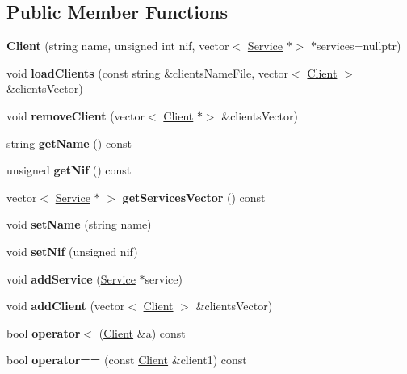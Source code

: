 \subsection*{Public Member Functions}
\begin{DoxyCompactItemize}
\item 
\mbox{\label{class_client_a3cdfb856b1cccd81052f589c850ab86f}} 
{\bfseries Client} (string name, unsigned int nif, vector$<$ \hyperlink{class_service}{Service} $\ast$$>$ $\ast$services=nullptr)
\item 
\mbox{\label{class_client_aeca0569267dbf7d1b20e4d77b98326af}} 
void {\bfseries load\+Clients} (const string \&clients\+Name\+File, vector$<$ \hyperlink{class_client}{Client} $>$ \&clients\+Vector)
\item 
\mbox{\label{class_client_a7f845c33f4aa7b7081ae72d9a16c2d3f}} 
void {\bfseries remove\+Client} (vector$<$ \hyperlink{class_client}{Client} $\ast$$>$ \&clients\+Vector)
\item 
\mbox{\label{class_client_a5c473ba52d7678744edec9e51052c947}} 
string {\bfseries get\+Name} () const
\item 
\mbox{\label{class_client_a35c9fed8cdb36d28fd5e51bd2aee852e}} 
unsigned {\bfseries get\+Nif} () const
\item 
\mbox{\label{class_client_ae241a8ae0811ea7c023dbc69d345a8b4}} 
vector$<$ \hyperlink{class_service}{Service} $\ast$ $>$ {\bfseries get\+Services\+Vector} () const
\item 
\mbox{\label{class_client_a1c7f938360e23b3e0e52d17965f88725}} 
void {\bfseries set\+Name} (string name)
\item 
\mbox{\label{class_client_a8d0ab1a3c654d361dacde7e1d2b92c94}} 
void {\bfseries set\+Nif} (unsigned nif)
\item 
\mbox{\label{class_client_abf36aa7168464608e917fa40f1ba52db}} 
void {\bfseries add\+Service} (\hyperlink{class_service}{Service} $\ast$service)
\item 
\mbox{\label{class_client_a2f9628fce03c1b43aa8eb9cb6b4e6280}} 
void {\bfseries add\+Client} (vector$<$ \hyperlink{class_client}{Client} $>$ \&clients\+Vector)
\item 
\mbox{\label{class_client_afb5d445b316288c82c98407c10ede17e}} 
bool {\bfseries operator$<$} (\hyperlink{class_client}{Client} \&a) const
\item 
\mbox{\label{class_client_a5cc669077f776648216ae03461b8c178}} 
bool {\bfseries operator==} (const \hyperlink{class_client}{Client} \&client1) const
\end{DoxyCompactItemize}
